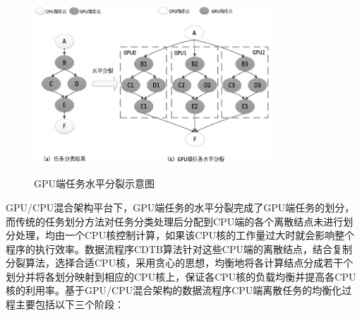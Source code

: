 \begin{figure}[htbp]
  \centering
  \includegraphics[width=0.8\textwidth]{Img/Chap_Application/Yu/3-1.png}\\
  \caption{GPU端任务水平分裂示意图}\label{fig:3.1}
\end{figure}


GPU/CPU混合架构平台下，GPU端任务的水平分裂完成了GPU端任务的划分，而传统的任务划分方法对任务分类处理后分配到CPU端的各个离散结点未进行划分处理，均由一个CPU核控制计算，如果该CPU核的工作量过大时就会影响整个程序的执行效率。数据流程序CDTB算法针对这些CPU端的离散结点，结合复制分裂算法，选择合适CPU核，采用贪心的思想，均衡地将各计算结点分成若干个划分并将各划分映射到相应的CPU核上，保证各CPU核的负载均衡并提高各CPU核的利用率。基于GPU/CPU混合架构的数据流程序CPU端离散任务的均衡化过程主要包括以下三个阶段：

